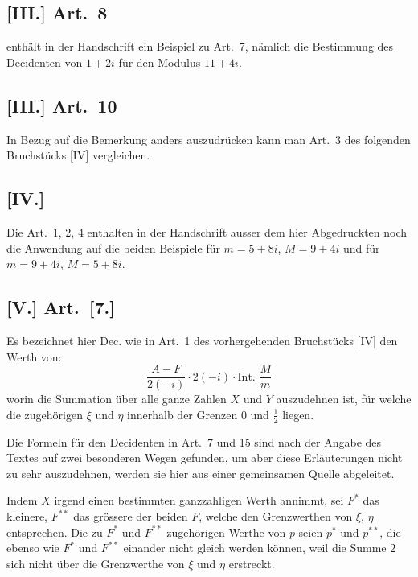 \documentclass[12pt,a4paper]{article}
\begin{document}
\subsection*{[III.] Art.~8}

enthält in der Handschrift ein Beispiel zu Art.~7, nämlich die Bestimmung des Decidenten von $1+2i$ für den Modulus $11+4i$.

\subsection*{[III.] Art.~10}

In Bezug auf die Bemerkung anders auszudrücken kann man Art.~3 des folgenden Bruchstücks [IV] vergleichen.

\subsection*{[IV.]}

Die Art.~1, 2, 4 enthalten in der Handschrift ausser dem hier Abgedruckten noch die Anwendung auf die beiden Beispiele für $m = 5 + 8i$, $M = 9 + 4i$ und für $m = 9 + 4i$, $M = 5 + 8i$.

\subsection*{[V.] Art.~[7.]}

Es bezeichnet hier Dec. wie in Art.~1 des vorhergehenden Bruchstücks [IV] den Werth von:
\[
\frac{A - F}{2(-i)} \cdot 2(-i) \cdot \text{Int. } \frac{M}{m}
\]
worin die Summation über alle ganze Zahlen $X$ und $Y$ auszudehnen ist, für welche die zugehörigen $\xi$ und $\eta$ innerhalb der Grenzen $0$ und $\frac{1}{2}$ liegen.

Die Formeln für den Decidenten in Art.~7 und 15 sind nach der Angabe des Textes auf zwei besonderen Wegen gefunden, um aber diese Erläuterungen nicht zu sehr auszudehnen, werden sie hier aus einer gemeinsamen Quelle abgeleitet.

Indem $X$ irgend einen bestimmten ganzzahligen Werth annimmt, sei $F^*$ das kleinere, $F^{**}$ das grössere der beiden $F$, welche den Grenzwerthen von $\xi$, $\eta$ entsprechen. Die zu $F^*$ und $F^{**}$ zugehörigen Werthe von $p$ seien $p^*$ und $p^{**}$, die ebenso wie $F^*$ und $F^{**}$ einander nicht gleich werden können, weil die Summe $2$ sich nicht über die Grenzwerthe von $\xi$ und $\eta$ erstreckt.
\end{document}
